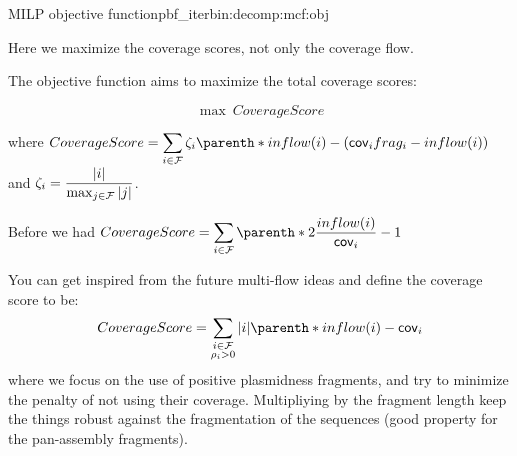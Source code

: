 \begin{definition}{\MCF{} MILP objective function}{pbf_iterbin:decomp:mcf:obj}
  \begin{newfeatbox}
    Here we maximize the coverage scores, not only the coverage flow.
  \end{newfeatbox}
  The objective function aims to maximize the total coverage scores:
  \begin{Objective}
    \begin{equation}
      \max ~ CoverageScore
      \label{pbf_iterbin:decomp:mcf:obj:max_coverage_score} %
    \end{equation}
  \end{Objective}
  where \(
    \displaystyle CoverageScore = %
    \sum_{i \in \Fragments{}} \fzeta{i} \parenth*{ inflow(i) - (\cov{i}\frag{i} - inflow(i)) }
  \) and \( \displaystyle \zeta_{i} = \frac{ |i| }{ \max_{j \in \mathcal{F}{}} |j| } \).

  \begin{notebox}
    Before we had \(
      \displaystyle CoverageScore = %
      \sum_{i \in \Fragments{}} \parenth*{2 \frac{inflow(i)}{\cov{i}} - 1}
    \)
  \end{notebox}

  \begin{ideabox}
    You can get inspired from the future multi-flow ideas and define the coverage score to be:
    \[
      CoverageScore = \sum_{
        \substack{
          i \in \Fragments{} \\
          \plm{i} > 0
        }
      } |i| \parenth*{ inflow(i) - \cov{i} }
    \]
    where we focus on the use of positive plasmidness fragments, and try to minimize the penalty of not using their coverage.
    Multipliying by the fragment length keep the things robust against the fragmentation of the sequences (good property for the pan-assembly fragments).
  \end{ideabox}
\end{definition}
